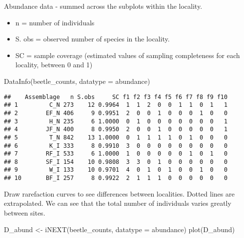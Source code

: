 \documentclass[
]{article}
\newenvironment{Shaded}{\begin{snugshade}}{\end{snugshade}}
\newcommand{\AttributeTok}[1]{\textcolor[rgb]{0.77,0.63,0.00}{#1}}
\newcommand{\FunctionTok}[1]{\textcolor[rgb]{0.00,0.00,0.00}{#1}}
\newcommand{\NormalTok}[1]{#1}
\newcommand{\OtherTok}[1]{\textcolor[rgb]{0.56,0.35,0.01}{#1}}
\newcommand{\StringTok}[1]{\textcolor[rgb]{0.31,0.60,0.02}{#1}}
\providecommand{\tightlist}{%
  \setlength{\itemsep}{0pt}\setlength{\parskip}{0pt}}
\begin{document}
Abundance data - summed across the subplots within the locality.

\begin{itemize}
\tightlist
\item
  n = number of individuals\\
\item
  S. obs = observed number of species in the locality.
\item
  SC = sample coverage (estimated values of sampling completeness for
  each locality, between 0 and 1)
\end{itemize}

\begin{Shaded}
\begin{Highlighting}[]
\FunctionTok{DataInfo}\NormalTok{(beetle\_counts, }\AttributeTok{datatype =} \StringTok{\textquotesingle{}abundance\textquotesingle{}}\NormalTok{)}
\end{Highlighting}
\end{Shaded}

\begin{verbatim}
##    Assemblage   n S.obs     SC f1 f2 f3 f4 f5 f6 f7 f8 f9 f10
## 1         C_N 273    12 0.9964  1  1  2  0  0  1  1  0  1   1
## 2        EF_N 406     9 0.9951  2  0  0  1  0  0  0  1  0   0
## 3         H_N 235     6 1.0000  0  1  0  0  0  0  0  0  0   1
## 4        JF_N 400     8 0.9950  2  0  0  1  0  0  0  0  0   1
## 5         T_N 842    13 1.0000  0  1  1  1  1  0  1  0  0   0
## 6         K_I 333     8 0.9910  3  0  0  0  0  0  0  0  0   0
## 7        RF_I 533     6 1.0000  1  0  0  0  0  0  1  0  1   0
## 8        SF_I 154    10 0.9808  3  3  0  1  0  0  0  0  0   0
## 9         W_I 133    10 0.9701  4  0  1  0  1  0  0  1  0   0
## 10       BF_I 257     8 0.9922  2  1  1  1  0  0  0  0  0   0
\end{verbatim}

Draw rarefaction curves to see differences between localities. Dotted
lines are extrapolated. We can see that the total number of individuals
varies greatly between sites.

\begin{Shaded}
\begin{Highlighting}[]
\NormalTok{D\_abund }\OtherTok{\textless{}{-}} \FunctionTok{iNEXT}\NormalTok{(beetle\_counts, }\AttributeTok{datatype =} \StringTok{\textquotesingle{}abundance\textquotesingle{}}\NormalTok{)}
\FunctionTok{plot}\NormalTok{(D\_abund)}
\end{Highlighting}
\end{Shaded}
\end{document}
